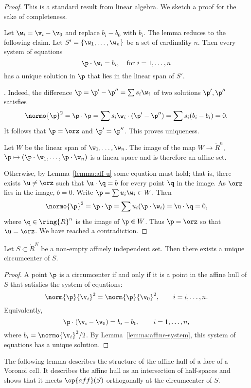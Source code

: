 \begin{proof} This is a standard result from linear algebra.
We sketch a proof for the sake of completeness.  

Let $\w_i = \v_i-\v_0$ and replace $b_i-b_0$ with $b_i$.  
The lemma reduces to the following claim.
Let $S' = \{\w_1,\ldots,\w_n\}$ be a  set
of cardinality $n$.  Then every system of equations
\[  
\p \cdot \w_i = b_i,\quad \text{for }i=1,\ldots,n
\] 
has a unique solution in $\p$ that lies in the linear span of $S'$.

. Indeed, the difference 
$\p = \p'-\p'' = \sum s_i \w_i$ of two solutions
$\p',\p''$ satisfies
\[  
\normo{\p}^2=\p\cdot\p = \sum s_i \w_i \cdot (\p' - \p'') =
\sum s_i (b_i-b_i)= 0.
\] 
It follows that $\p=\orz$ and $\p'=\p''$.  This proves uniqueness.

Let $W$ be the linear span of $\w_1,\ldots,\w_n$.  The image of the
map $W\to\ring{R}^n$, $\p\mapsto (\p\cdot\w_1,\ldots,\p\cdot\w_n)$ is
a linear space and is therefore an affine set.

Otherwise, by Lemma~\ref{lemma:aff-u} some equation must hold; that
is, there exists $\u\ne \orz$ such that $\u\cdot \q =b$ for every
point $\q$ in the image.  As $\orz$ lies in the image, $b=0$.  Write
$\p = \sum u_i \w_i\in W$.  Then
\[  
\normo{\p}^2 = \p\cdot\p = \sum u_i (\p \cdot \w_i) = \u\cdot \q = 0,
\]  
where $\q\in\ring{R}^n$ is the image of $\p\in W$.
Thus $\p=\orz$ so that $\u=\orz$.  We have reached a contradiction.
\end{proof}

\begin{lemma} 
  Let $S\subset \ring{R}^N$ be a non-empty affinely independent set.
  Then there exists a unique circumcenter of $S$.
\end{lemma}

\begin{proof} 
  A point $\p$ is a circumcenter if and only if it is a point in the
  affine hull of $S$ that satisfies the system of equations:
\[  
\norm{\p}{\v_i}^2 = \norm{\p}{\v_0}^2,\qquad i = i,\ldots,n.
\] 
Equivalently,
\[  
\p\cdot (\v_i-\v_0) = b_i-b_0,\qquad i=1,\ldots,n,
\] 
where $b_i = \normo{\v_i}^2/2$.  By
Lemma~\ref{lemma:affine-system}, this system of equations has a unique
solution.
\end{proof}

The following lemma describes the structure of the affine hull of a
face of a Voronoi cell.  It describes the affine hull as an intersection of half-spaces
and shows that it meets $\op{aff}(S)$ orthogonally at the circumcenter of $S$.

